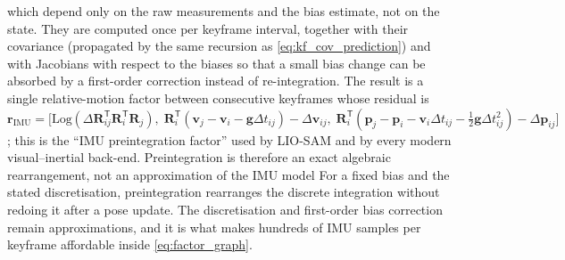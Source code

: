 \documentclass[graybox,envcountchap]{style/SNmono}
\providecommand{\DIFadd}[1]{{\protect\color{blue} #1}} %
\providecommand{\DIFdel}[1]{{\protect\color{red} #1}} %
\providecommand{\DIFaddbegin}{} %
\providecommand{\DIFaddend}{} %
\providecommand{\DIFdelbegin}{} %
\providecommand{\DIFdelend}{} %
\begin{document}
which depend only on the raw measurements and the bias estimate, not on the state. They are computed once per keyframe interval, together with their covariance (propagated by the same recursion as \eqref{eq:kf_cov_prediction}) and with Jacobians with respect to the biases so that a small bias change can be absorbed by a first-order correction instead of re-integration. The result is a single relative-motion factor between consecutive keyframes whose residual is $\mathbf{r}_{\mathrm{IMU}}=\big[\mathrm{Log}(\Delta\mathbf{R}_{ij}^{\mathsf T}\mathbf{R}_i^{\mathsf T}\mathbf{R}_j),\;\mathbf{R}_i^{\mathsf T}(\mathbf{v}_j-\mathbf{v}_i-\mathbf{g}\Delta t_{ij})-\Delta\mathbf{v}_{ij},\;\mathbf{R}_i^{\mathsf T}(\mathbf{p}_j-\mathbf{p}_i-\mathbf{v}_i\Delta t_{ij}-\tfrac12\mathbf{g}\Delta t_{ij}^{2})-\Delta\mathbf{p}_{ij}\big]$; this is the ``IMU preintegration factor'' used by LIO-SAM \cite{shan2020_liosam} and by every modern visual--inertial back-end. \DIFdelbegin \DIFdel{Preintegration is therefore an exact algebraic rearrangement, not an approximation of the IMU model}\DIFdelend \DIFaddbegin \DIFadd{For a fixed bias and the stated discretisation, preintegration rearranges the discrete integration without redoing it after a pose update. The discretisation and first-order bias correction remain approximations}\DIFaddend , and it is what makes hundreds of IMU samples per keyframe affordable inside \eqref{eq:factor_graph}.
\end{document}
